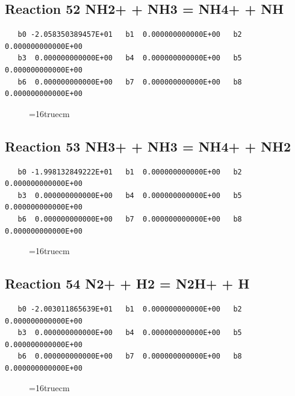 \documentclass[12pt,dvipdfm]{article}
\begin{document}
\subsection{
Reaction 52 NH2+ + NH3 = NH4+ + NH }
\begin{small}\begin{verbatim}
   b0 -2.058350389457E+01   b1  0.000000000000E+00   b2  0.000000000000E+00
   b3  0.000000000000E+00   b4  0.000000000000E+00   b5  0.000000000000E+00
   b6  0.000000000000E+00   b7  0.000000000000E+00   b8  0.000000000000E+00
\end{verbatim}\end{small}
\begin{figure}[h!] \label{n2rates}
\epsfxsize=16truecm
\end{figure}
\newpage

\subsection{
Reaction 53 NH3+ + NH3 = NH4+ + NH2 }
\begin{small}\begin{verbatim}
   b0 -1.998132849222E+01   b1  0.000000000000E+00   b2  0.000000000000E+00
   b3  0.000000000000E+00   b4  0.000000000000E+00   b5  0.000000000000E+00
   b6  0.000000000000E+00   b7  0.000000000000E+00   b8  0.000000000000E+00
\end{verbatim}\end{small}
\begin{figure}[h!] \label{n2rates}
\epsfxsize=16truecm
\end{figure}
\newpage

\subsection{
Reaction 54 N2+ + H2 = N2H+ + H }
\begin{small}\begin{verbatim}
   b0 -2.003011865639E+01   b1  0.000000000000E+00   b2  0.000000000000E+00
   b3  0.000000000000E+00   b4  0.000000000000E+00   b5  0.000000000000E+00
   b6  0.000000000000E+00   b7  0.000000000000E+00   b8  0.000000000000E+00
\end{verbatim}\end{small}
\begin{figure}[h!] \label{n2rates}
\epsfxsize=16truecm
\end{figure}
\newpage
\end{document}
